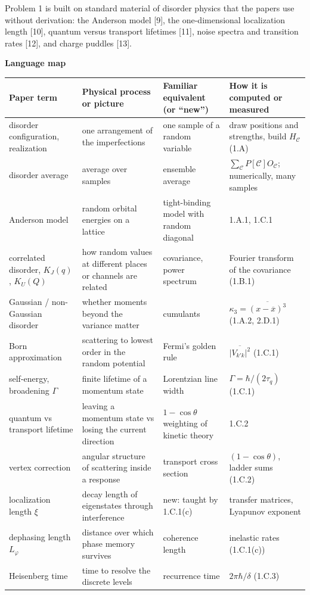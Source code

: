 \documentclass[11pt,a4paper]{article}
\newcommand{\avg}[1]{\overline{#1}}
\newcommand{\smallheading}[1]{\par\Needspace{6\baselineskip}\medskip\textbf{#1}\par}
\begin{document}
Problem 1 is built on standard material of disorder physics that the papers use without derivation: the Anderson model [9], the one-dimensional localization length [10], quantum versus transport lifetimes [11], noise spectra and transition rates [12], and charge puddles [13].

\smallheading{Language map}
{\small\begin{longtable}{@{}p{30mm}p{45mm}p{38mm}p{40mm}@{}}\toprule
Paper term&Physical process or picture&Familiar equivalent (or ``new'')&How it is computed or measured\\\midrule\endhead
disorder configuration, realization&one arrangement of the imperfections&one sample of a random variable&draw positions and strengths, build $H_{\mathcal C}$ (1.A)\\
disorder average&average over samples&ensemble average&$\sum_{\mathcal C}P[\mathcal C]O_{\mathcal C}$; numerically, many samples\\
Anderson model&random orbital energies on a lattice&tight-binding model with random diagonal&1.A.1, 1.C.1\\
correlated disorder, $K_J(q)$, $K_U(Q)$&how random values at different places or channels are related&covariance, power spectrum&Fourier transform of the covariance (1.B.1)\\
Gaussian / non-Gaussian disorder&whether moments beyond the variance matter&cumulants&$\kappa_3=\avg{(x-\avg x)^3}$ (1.A.2, 2.D.1)\\
Born approximation&scattering to lowest order in the random potential&Fermi's golden rule&$\avg{|V_{k'k}|^2}$ (1.C.1)\\
self-energy, broadening $\Gamma$&finite lifetime of a momentum state&Lorentzian line width&$\Gamma=\hbar/(2\tau_q)$ (1.C.1)\\
quantum vs transport lifetime&leaving a momentum state vs losing the current direction&$1-\cos\theta$ weighting of kinetic theory&1.C.2\\
vertex correction&angular structure of scattering inside a response&transport cross section&$(1-\cos\theta)$, ladder sums (1.C.2)\\
localization length $\xi$&decay length of eigenstates through interference&new: taught by 1.C.1(c)&transfer matrices, Lyapunov exponent\\
dephasing length $L_\varphi$&distance over which phase memory survives&coherence length&inelastic rates (1.C.1(c))\\
Heisenberg time&time to resolve the discrete levels&recurrence time&$2\pi\hbar/\delta$ (1.C.3)\\

\end{longtable}}
\end{document}
